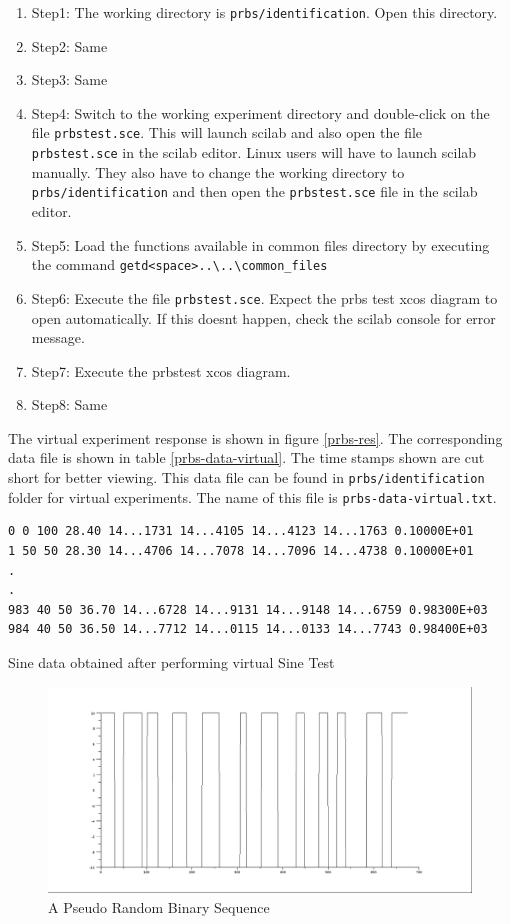 \begin{enumerate}
\item Step1: The working directory is {\tt  prbs/identification}. Open this directory.
\item Step2: Same
\item Step3: Same
\item Step4:  Switch to the working experiment directory and double-click on the file {\tt prbstest.sce}. This will launch scilab and also open the file {\tt prbstest.sce} in the scilab editor. Linux users will have to launch scilab manually. They also have to change the working directory to {\tt  prbs/identification} and then open the {\tt  prbstest.sce} file in the scilab editor.
\item Step5:  Load the functions available in common files directory by executing the command {\tt getd<space>..\textbackslash ..\textbackslash common\_files\ }
\item Step6: Execute the file {\tt prbstest.sce}.  Expect the prbs test xcos diagram to open automatically. If this doesnt happen, check the scilab console for error message.
\item Step7: Execute the prbstest xcos diagram.
\item Step8: Same
\end{enumerate}


 The virtual experiment response is shown in figure \ref{prbs-res}. The corresponding data file is shown in table \ref{prbs-data-virtual}. The time stamps shown are cut short for better viewing. This data file can be found in {\tt prbs/identification} folder for virtual experiments. The name of this file is {\tt prbs-data-virtual.txt}.



\begin{table}
\begin{verbatim}
0 0 100 28.40 14...1731 14...4105 14...4123 14...1763 0.10000E+01
1 50 50 28.30 14...4706 14...7078 14...7096 14...4738 0.10000E+01
.
.
983 40 50 36.70 14...6728 14...9131 14...9148 14...6759 0.98300E+03
984 40 50 36.50 14...7712 14...0115 14...0133 14...7743 0.98400E+03
\end{verbatim}
\caption{Sine data obtained after performing virtual Sine Test}
\label{prbs-data-virtual}
\end{table}


\begin{figure}
\centering
\includegraphics[width=0.7\linewidth]{prbs/prbs-illustration.png}
\caption{A Pseudo Random Binary Sequence}
\label{prbs-fig}
\end{figure}

